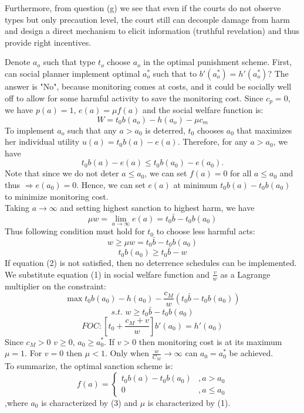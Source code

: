 \documentclass[12pt,english]{article}%
\makeatletter
\renewcommand{\section}{\@startsection{section}{1}{0mm}{-1.5\baselineskip}{0.8\baselineskip}{\normalfont\large\centering}}
\makeatother
\begin{document}
\begin{enumerate}[(a)]
		Furthermore, from question (g) we see that even if the courts do not observe types but only precaution level, the court still can decouple damage from harm and design a direct mechanism to elicit information (truthful revelation) and thus provide right incentives.
		
	\end{enumerate}
	
\section{Marginal Deterrence}	
	Denote $a_o$ such that type $t_o$ choose $a_o$ in the optimal punishment scheme.
	First, can social planner implement optimal $a_o^*$ such that to $b'(a_o^*)=h'(a_o^*)$? The answer is "No", because  monitoring comes at costs, and it could be socially well off to allow for some harmful activity to save the monitoring cost. Since $c_p=0$, we have $p(a)=1$, $e(a)=\mu{f(a)}$ and the social welfare function is:
	$$W=t_0b(a_o)-h(a_o)-\mu{c_m}$$ 
	To implement $a_o$ such that any ${a}>a_0$ is deterred, 
	 $t_0$ chooses $a_0$ that maximizes her individual utility $u(a)=t_0b(a)-e(a)$. Therefore, for any ${a}>a_0$, we have
	 $$t_0b(a)-e(a)\leq{t_0b(a_0)}-e(a_0).$$
	 Note that since we do not deter $a\leq{a_0}$, we can set $f(a)=0$ for all ${a}{\leq}{a_0}$ and thus $\Rightarrow{e(a_0)=0}$. Hence, we can set $e(a)$ at minimum $t_0b(a)-t_0b(a_0)$ to minimize monitoring cost.
	 \\Taking $a\rightarrow\infty$ and setting highest sanction to highest harm, we have
	 \begin{equation}
	 \mu{w}=\lim_{a\rightarrow\infty}e(a)=t_0\bar{b}-t_0b(a_0)
	\end{equation}
	Thus following condition must hold for $t_0$ to choose less harmful acts:
	  $$w\geq\mu{w}=t_0\bar{b}-t_0b(a_0)$$
	 \begin{equation}t_0b(a_0)\geq{t_0\bar{b}}-w\end{equation} If equation (2) is not satisfied, then no deterrence schedules can be implemented. We substitute equation (1) in social welfare function and $\frac{v}{w}$ as a Lagrange multiplier on the constraint:
	 $$\max{t_0}b(a_0)-h(a_0)-\frac{c_M}{w}(t_0\bar{b}-t_0b(a_0))$$
	 $$\textit{s.t. }w\geq{t_0}\bar{b}-t_0b(a_0)$$
	 \begin{equation}
	FOC:[t_0+\frac{c_M+v}{w}]b'(a_0)=h'(a_0)
	 \end{equation}
	 Since $c_M>0$ $v\geq0$, $a_0\geq{a_0^*}$. If $v>0$ then monitoring cost is at its maximum $\mu=1$. For $v=0$ then $\mu<1$. Only when $\frac{w}{C_M}\rightarrow\infty$ can $a_0=a_0^*$ be achieved.\\
	 To summarize, the optimal sanction scheme is: 
	 	\[
        f(a)=\begin{cases}
        t_0b(a)-t_0b(a_0) & ,a>a_0 \\
        0 & ,a\leq{a_0} 
        \end{cases}
        \]
        ,where $a_0$ is characterized by (3) and $\mu$ is characterized by (1).
\end{document}

